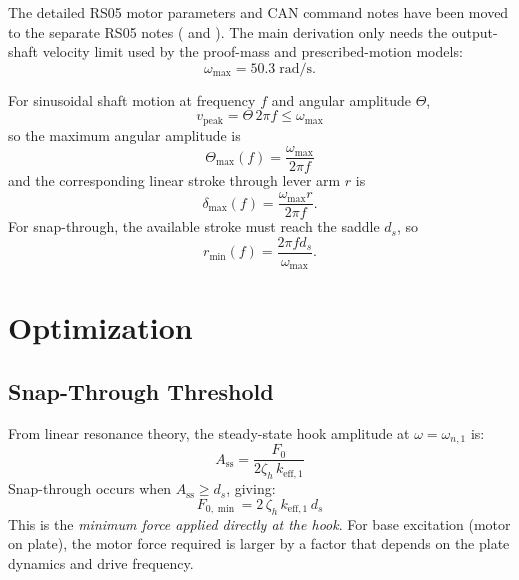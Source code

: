 \documentclass[11pt,letterpaper]{article}
\begin{document}
The detailed RS05 motor parameters and CAN command notes have been moved to the
separate RS05 notes ( and
). The main derivation only needs the
output-shaft velocity limit used by the proof-mass and prescribed-motion models:
\begin{equation}
  \omega_{\max} = 50.3\;\text{rad/s}.
\end{equation}

For sinusoidal shaft motion at frequency $f$ and angular amplitude $\Theta$,
\begin{equation}
  v_{\mathrm{peak}} = \Theta\,2\pi f \leq \omega_{\max}
  \label{eq:vpeak}
\end{equation}
so the maximum angular amplitude is
\begin{equation}
  \Theta_{\max}(f) = \frac{\omega_{\max}}{2\pi f}
  \label{eq:Thetamax}
\end{equation}
and the corresponding linear stroke through lever arm $r$ is
\begin{equation}
  \delta_{\max}(f) = \frac{\omega_{\max}r}{2\pi f}.
  \label{eq:deltamax}
\end{equation}
For snap-through, the available stroke must reach the saddle $d_s$, so
\begin{equation}
  r_{\min}(f) = \frac{2\pi f d_s}{\omega_{\max}}.
  \label{eq:rmin}
\end{equation}

\section{Optimization}
\label{sec:opt}

\subsection{Snap-Through Threshold}
\label{ssec:F0min}

From linear resonance theory, the steady-state hook amplitude at $\omega = \omega_{n,1}$
is:
\begin{equation}
  A_{\mathrm{ss}} = \frac{F_0}{2\zeta_h\,k_{\mathrm{eff},1}}
  \label{eq:Ass}
\end{equation}
Snap-through occurs when $A_{\mathrm{ss}} \geq d_s$, giving:
\begin{equation}
  \boxed{F_{0,\min} = 2\,\zeta_h\,k_{\mathrm{eff},1}\,d_s}
  \label{eq:F0min2}
\end{equation}
This is the \emph{minimum force applied directly at the hook}.  For base
excitation (motor on plate), the motor force required is larger by a factor
that depends on the plate dynamics and drive frequency.
\end{document}
